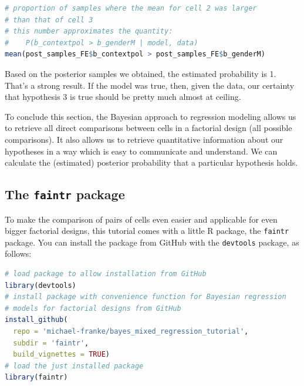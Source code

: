 \documentclass[nobib]{tufte-handout}
\begin{document}
\bigskip

\begin{minipage}[]{1.1\textwidth}
\begin{lstlisting}[language=R]
# proportion of samples where the mean for cell 2 was larger 
# than that of cell 3 
# this number approximates the quantity:
#    P(b_contextpol > b_genderM | model, data)
mean(post_samples_FE$b_contextpol > post_samples_FE$b_genderM)
\end{lstlisting}
\end{minipage}

Based on the posterior samples we obtained, the estimated probability is 1. That's a strong result. If the model was true, then, given the data, our certainty that hypothesis 3 is true should be pretty much almost at ceiling.

To conclude this section, the Bayesian approach to regression modeling allows us to retrieve all direct comparisons between cells in a factorial design (all possible comparisons). It also allows us to retrieve quantitative information about our hypotheses in a way which is easy to communicate and understand. We can calculate the (estimated) posterior probability that a particular hypothesis holds. 

\subsection{The \texttt{faintr} package}

To make the comparison of pairs of cells even easier and applicable for even bigger factorial designs, this tutorial comes with a little R package, the \texttt{faintr} package.
%
%
You can install the package from GitHub with the \texttt{devtools} package, as follows:

\medskip 

\begin{minipage}[]{1.3\textwidth}
\begin{lstlisting}[language=R]
# load package to allow installation from GitHub
library(devtools)
# install package with convenience function for Bayesian regression 
# models for factorial designs from GitHub
install_github(
  repo = 'michael-franke/bayes_mixed_regression_tutorial', 
  subdir = 'faintr',
  build_vignettes = TRUE)
# load the just installed package
library(faintr)
\end{lstlisting}
\end{minipage}
\end{document}
